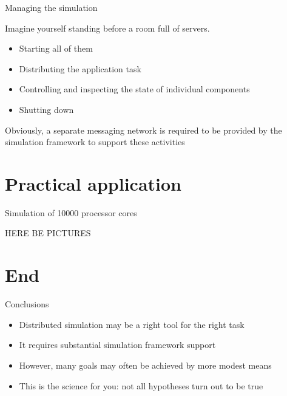 \begin{frame}{Managing the simulation}

Imagine yourself standing before a room full of servers.

\begin{itemize}
\item Starting all of them
\item Distributing the application task
\item Controlling and inspecting the state of individual components
\item Shutting down
\end{itemize}

Obviously, a separate messaging network is required to be provided by the simulation framework to support these activities

\end{frame}


\section{Practical application}

\begin{frame}{Simulation of 10000 processor cores}

\Huge HERE BE PICTURES

\end{frame}



\section{End}

\begin{frame}{Conclusions}
\begin{itemize}
\item Distributed simulation may be a right tool for the right task
\item It requires substantial simulation framework support 
\item However, many goals may often be achieved by more modest means
\item This is the science for you: not all hypotheses turn out to be true
\end{itemize}
\end{frame}

